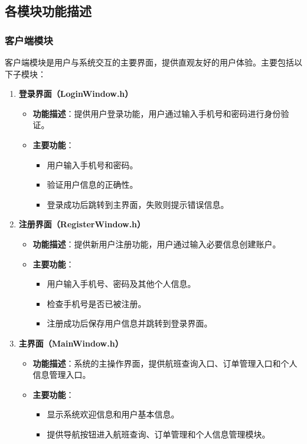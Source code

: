 \documentclass[UTF8, a4paper,12pt]{ctexart}
\begin{document}
\subsection{各模块功能描述}

\subsubsection{客户端模块}

客户端模块是用户与系统交互的主要界面，提供直观友好的用户体验。主要包括以下子模块：

\begin{enumerate}
    \item \textbf{登录界面（LoginWindow.h）}
    \begin{itemize}
        \item \textbf{功能描述}：提供用户登录功能，用户通过输入手机号和密码进行身份验证。
        \item \textbf{主要功能}：
        \begin{itemize}
            \item 用户输入手机号和密码。
            \item 验证用户信息的正确性。
            \item 登录成功后跳转到主界面，失败则提示错误信息。
        \end{itemize}
    \end{itemize}
    
    \item \textbf{注册界面（RegisterWindow.h）}
    \begin{itemize}
        \item \textbf{功能描述}：提供新用户注册功能，用户通过输入必要信息创建账户。
        \item \textbf{主要功能}：
        \begin{itemize}
            \item 用户输入手机号、密码及其他个人信息。
            \item 检查手机号是否已被注册。
            \item 注册成功后保存用户信息并跳转到登录界面。
        \end{itemize}
    \end{itemize}
    
    \item \textbf{主界面（MainWindow.h）}
    \begin{itemize}
        \item \textbf{功能描述}：系统的主操作界面，提供航班查询入口、订单管理入口和个人信息管理入口。
        \item \textbf{主要功能}：
        \begin{itemize}
            \item 显示系统欢迎信息和用户基本信息。
            \item 提供导航按钮进入航班查询、订单管理和个人信息管理模块。
        \end{itemize}
    \end{itemize}
    

\end{enumerate}
\end{document}
